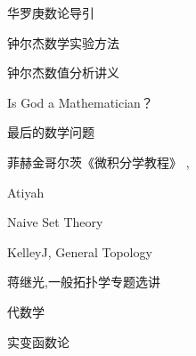 \documentclass[main.tex]{subfiles}
\begin{document}
华罗庚数论导引
\cite[p.~1]{HuaL}

钟尔杰数学实验方法 \cite{ZhongEr1}

钟尔杰数值分析讲义 \cite{ZhongEr2}

Is God a Mathematician？\cite{LivioM}

最后的数学问题 \cite{LivioM2}

菲赫金哥尔茨《微积分学教程》\cite{FeiH1}
\cite{FeiH2}, \cite{FeiH3}

Atiyah \cite{AM69}

Naive Set Theory \cite{HalmosP}

KelleyJ, General Topology \cite{KelleyJ}
	
蒋继光,一般拓扑学专题选讲\cite{JiangJi}

代数学\cite{derWaerden}

实变函数论\cite{Natanco}
\end{document}
